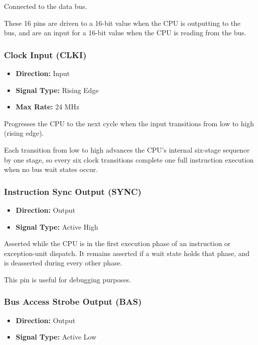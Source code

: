 Connected to the data bus.

These 16 pins are driven to a 16-bit value when the CPU is outputting to the bus, and are an input for a 16-bit value
when the CPU is reading from the bus.

\subsubsection{Clock Input (CLKI)}

\begin{itemize}
	\item \textbf{Direction:} Input
	\item \textbf{Signal Type:} Rising Edge
	\item \textbf{Max Rate:} 24 MHz
\end{itemize}

Progresses the CPU to the next cycle when the input transitions from low to high (rising edge).

Each transition from low to high advances the CPU's internal six-stage sequence by one stage, so every six clock
transitions complete one full instruction execution when no bus wait states occur.

\subsubsection{Instruction Sync Output (SYNC)}

\begin{itemize}
	\item \textbf{Direction:} Output
	\item \textbf{Signal Type:} Active High
\end{itemize}

Asserted while the CPU is in the first execution phase of an instruction or exception-unit dispatch. It remains
asserted if a wait state holds that phase, and is deasserted during every other phase.

This pin is useful for debugging purposes.

\subsubsection{Bus Access Strobe Output (BAS)}

\begin{itemize}
	\item \textbf{Direction:} Output
	\item \textbf{Signal Type:} Active Low
\end{itemize}

